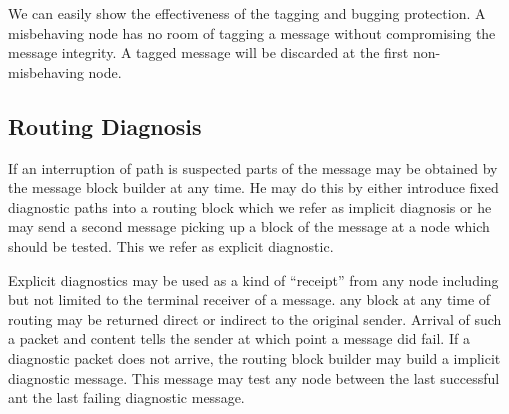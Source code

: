 \documentclass[9pt,journal,compsoc]{IEEEtran}
\begin{document}
We can easily show the effectiveness of the tagging and bugging protection. A misbehaving node has no room of tagging a message without compromising the message integrity. A tagged message will be discarded at the first non-misbehaving node.

\subsection{Routing Diagnosis}
If an interruption of path is suspected parts of the message may be obtained by the message block builder at any time. He may do this by either introduce fixed diagnostic paths into a routing block which we refer as implicit diagnosis or he may send a second message picking up a block of the message at a node which should be tested. This we refer as explicit diagnostic.

Explicit diagnostics may be used as a kind of ``receipt'' from any node including but not limited to the terminal receiver of a message. any block at any time of routing may be returned direct or indirect to the original sender. Arrival of such a packet and content tells the sender at which point a message did fail. If a diagnostic packet does not arrive, the routing block builder may build a implicit diagnostic message. This message may test any node between the last successful ant the last failing diagnostic message.

%
%

\end{document}
